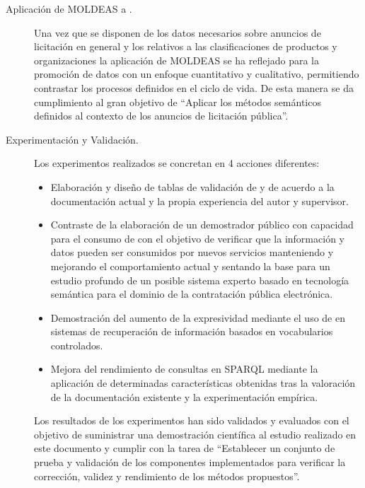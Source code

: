 \begin{description}
\item [Aplicación de MOLDEAS a \eproc.] Una vez que se disponen de los datos necesarios sobre anuncios de licitación en general y los relativos 
a las clasificaciones de productos y organizaciones la aplicación de MOLDEAS se ha reflejado para la promoción de datos con un enfoque 
cuantitativo y cualitativo, permitiendo contrastar los procesos definidos en el ciclo de vida. De esta manera se da cumplimiento 
al gran objetivo de ``Aplicar los métodos semánticos definidos al contexto de los anuncios de licitación pública''.  

\item [Experimentación y Validación.] Los experimentos realizados se concretan en 4 acciones diferentes:
\begin{itemize}
 \item Elaboración y diseño de tablas de validación de \linkeddata y \opendata de acuerdo a la documentación 
actual y la propia experiencia del autor y supervisor.
\item Contraste de la elaboración de un demostrador público con capacidad para el consumo de \linkeddata con el objetivo de 
verificar que la información y datos pueden ser consumidos por nuevos servicios manteniendo y mejorando el comportamiento 
actual y sentando la base para un estudio profundo de un posible sistema experto basado en tecnología semántica 
para el dominio de la contratación pública electrónica.
\item Demostración del aumento de la expresividad mediante el uso de \linkeddata en sistemas de recuperación 
de información basados en vocabularios controlados.
\item Mejora del rendimiento de consultas en \gls{SPARQL} mediante la aplicación de determinadas características obtenidas 
tras la valoración de la documentación existente y la experimentación empírica.
\end{itemize}

Los resultados de los experimentos han sido validados y evaluados con el objetivo de suministrar una demostración 
científica al estudio realizado en este documento y cumplir con la tarea de ``Establecer un conjunto de prueba y validación de los componentes implementados para verificar la corrección, 
 validez y rendimiento de los métodos propuestos''.



\end{description}
